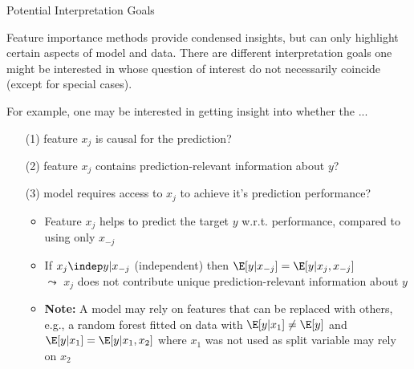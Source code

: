 \documentclass[11pt,compress,t,notes=noshow, aspectratio=169, xcolor=table]{beamer}
\begin{document}
\begin{frame}{Potential Interpretation Goals}

Feature importance methods provide condensed insights, but can only highlight certain aspects of model and data. There are different interpretation goals one might be interested in whose question of interest do not necessarily coincide (except for special cases).

\lz

For example, one may be interested in getting insight into whether the ...

\begin{enumerate}
    \item[(1)] feature $x_j$ is causal for the prediction?
    \item[(2)] feature $x_j$ contains prediction-relevant information about $y$?
    \item[(3)] model requires access to $x_j$ to achieve it's prediction performance?
    \begin{itemize}
      \item Feature $x_{j}$ helps to predict the target $y$ w.r.t. performance, compared to using only $x_{-j}$  %
      \item If $x_j \indep y | x_{-j}$ (independent) then $\E[y|x_{-j}] = \E[y|x_j, x_{-j}]$ \\
      $\leadsto$ $x_j$ does not contribute unique prediction-relevant information about $y$
      \item \textbf{Note:} A model may rely on features that can be replaced with others, e.g., a random forest fitted on data with $\E[y|x_1] \neq \E[y]$ and $\E[y|x_1] = \E[y|x_1, x_2]$ where $x_1$ was not used as split variable may rely on $x_2$ %
    \end{itemize}
\end{enumerate}
\end{frame}
\end{document}
